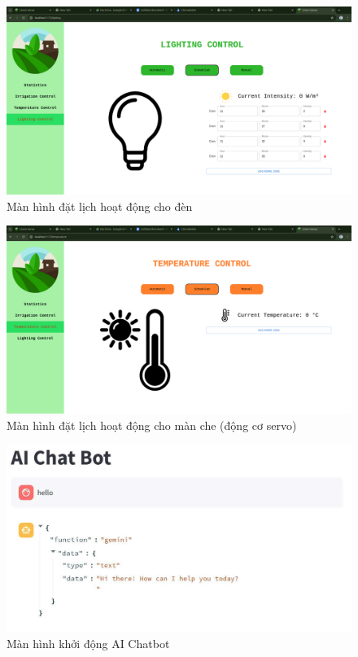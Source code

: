 \begin{figure}[H]
    \centering
    \includegraphics[width=1\linewidth]{content/images/light_job.png}
    \caption{Màn hình đặt lịch hoạt động cho đèn}
\end{figure}

\begin{figure}[H]
    \centering
    \includegraphics[width=1\linewidth]{content/images/temp_job.png}
    \caption{Màn hình đặt lịch hoạt động cho màn che (động cơ servo)}
\end{figure}

\begin{figure}[H]
    \centering
    \includegraphics[width=1\linewidth]{content/images/AI_Chatbox_1.jpg}
    \caption{Màn hình khởi động AI Chatbot}
\end{figure}

